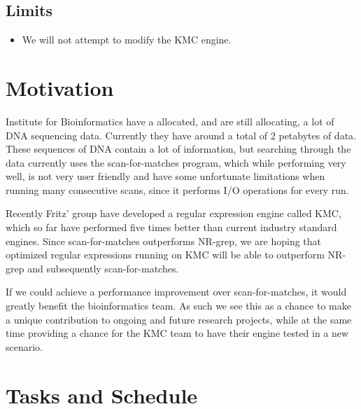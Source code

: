 \documentclass[12pt]{article}
\begin{document}
\subsection{Limits}

\begin{itemize}
	\item We will not attempt to modify the KMC engine.
\end{itemize}

\newpage

\section{Motivation}

Institute for Bioinformatics have a allocated, and are still allocating, a lot of DNA sequencing data. Currently they have around a total of 2 petabytes of data. These sequences of DNA contain a lot of information, but searching through the data currently uses the scan-for-matches program, which while performing very well, is not very user friendly and have some unfortunate limitations when running many consecutive scans, since it performs I/O operations for every run.

Recently Fritz' group have developed a regular expression engine called KMC, which so far have performed five times better than current industry standard engines. Since scan-for-matches outperforms NR-grep\cite{nrgrep}, we are hoping that optimized regular expressions running on KMC will be able to outperform NR-grep and subsequently scan-for-matches.

If we could achieve a performance improvement over scan-for-matches, it would greatly benefit the bioinformatics team. As such we see this as a chance to make a unique contribution to ongoing and future research projects, while at the same time providing a chance for the KMC team to have their engine tested in a new scenario.

\newpage

\section{Tasks and Schedule}
\end{document}
